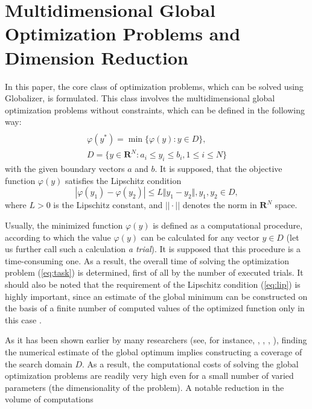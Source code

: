 \documentclass{naco}
\theoremstyle{definition}
\begin{document}
\section{Multidimensional Global Optimization Problems and Dimension Reduction}
\label{sec:problem}
In this paper, the core class of optimization problems, which can be solved using
Globalizer, is formulated. This class involves the multidimensional global
optimization problems without constraints, which can be defined in the following way:
\begin{equation}
\label{eq:task}
\begin{array}{cr}\\
  \varphi(y^*)=\min\{\varphi(y):y\in D\}, \\
  D=\{y\in \mathbf{R}^N:a_i\leq y_i\leq{b_i}, 1\leq{i}\leq{N}\}
\end{array}
\end{equation}
with the given boundary vectors  $a$ and  $b$. It is supposed, that the objective function \(\varphi(y)\) satisfies the Lipschitz condition
\begin{equation}
\label{eq:lip}
|\varphi(y_1)-\varphi(y_2)|\leq L\Vert y_1-y_2\Vert,y_1,y_2\in D,
\end{equation}
where \(L>0\) is the Lipschitz constant, and \(||\cdot||\) denotes the norm in \(\mathbf{R}^N\) space.
\par
Usually, the minimized function \(\varphi(y)\) is defined as a computational procedure,
according to which the value \(\varphi(y)\) can be calculated for any vector \(y\in D\)
(let us further call such a calculation \textit{a trial}). It is supposed that this procedure
is a time-consuming one. As a result, the overall time of solving the optimization
problem (\ref{eq:task}) is determined, first of all by the number of executed trials.
It should also be noted that the requirement of the Lipschitz condition (\ref{eq:lip})
is highly important, since an estimate of the global minimum can be constructed on the
basis of a finite number of computed values of the optimized function only in this case .
\par
As it has been shown earlier by many researchers
(see, for instance, \cite{floudasPardalosGOState}, \cite{horstTuyGO}, \cite{pinterGO}, \cite{strSergGO}),
finding the numerical estimate of the global optimum implies constructing a coverage of
the search domain \(D\). As a result, the computational costs of solving the global
optimization problems are readily very high even for a small number of varied parameters
(the dimensionality of the problem). A notable reduction in the volume of computations
\end{document}
